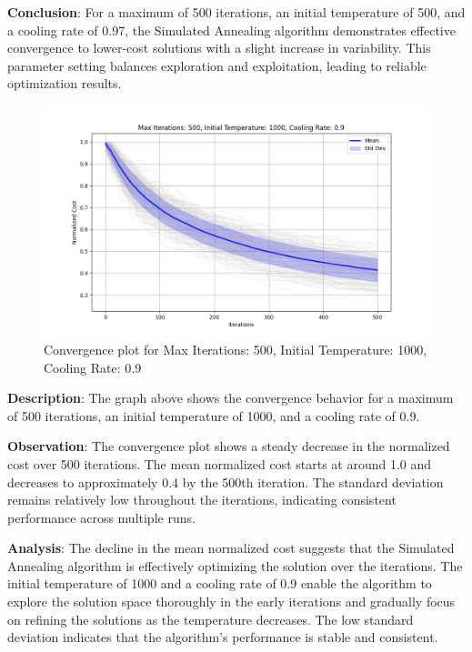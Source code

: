 \documentclass[
]{article}
\begin{document}
    \textbf{Conclusion}: For a maximum of 500 iterations, an initial temperature of 500, and a cooling rate of 0.97, the Simulated Annealing algorithm demonstrates effective convergence to lower-cost solutions with a slight increase in variability. This parameter setting balances exploration and exploitation, leading to reliable optimization results.

    \begin{figure}[H]
        \centering
        \includegraphics[width=\textwidth]{simulated_annealing/max_iter_500_init_temp_1000_cooling_rate_0.9}
        \caption{Convergence plot for Max Iterations: 500, Initial Temperature: 1000, Cooling Rate: 0.9}
        \label{fig:sa_500_1000_0.9}
    \end{figure}

    \textbf{Description}: The graph above shows the convergence behavior for a maximum of 500 iterations, an initial temperature of 1000, and a cooling rate of 0.9.

    \textbf{Observation}: The convergence plot shows a steady decrease in the normalized cost over 500 iterations. The mean normalized cost starts at around 1.0 and decreases to approximately 0.4 by the 500th iteration. The standard deviation remains relatively low throughout the iterations, indicating consistent performance across multiple runs.

    \textbf{Analysis}: The decline in the mean normalized cost suggests that the Simulated Annealing algorithm is effectively optimizing the solution over the iterations. The initial temperature of 1000 and a cooling rate of 0.9 enable the algorithm to explore the solution space thoroughly in the early iterations and gradually focus on refining the solutions as the temperature decreases. The low standard deviation indicates that the algorithm's performance is stable and consistent.
\end{document}
